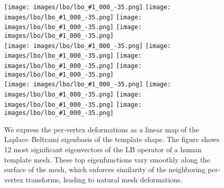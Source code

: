 \begin{figure}
\newcommand{\lbofig}[1]{%
\texttt{[image: images/lbo/lbo\_\#1\_000\_-35.png]}%
}%
\centering%
\lbofig{00000}%
\lbofig{00001}%
\lbofig{00002}%
\lbofig{00003}\\
\lbofig{00004}%
\lbofig{00005}%
\lbofig{00006}%
\lbofig{00007}\\
\lbofig{00008}%
\lbofig{00009}%
\lbofig{00010}%
\lbofig{00011}\\
\caption{We express the per-vertex deformations as a linear map of the Laplace--Beltrami eigenbasis of the template shape.
The figure shows 12 most significant eigenvectors of the LB operator of a human template mesh.
These top eigenfunctions vary smoothly along the surface of the mesh, 
which enforces similarity of the neighboring per-vertex transforms, leading to natural mesh deformations.}
\label{fig:lbo-fig}
\end{figure}